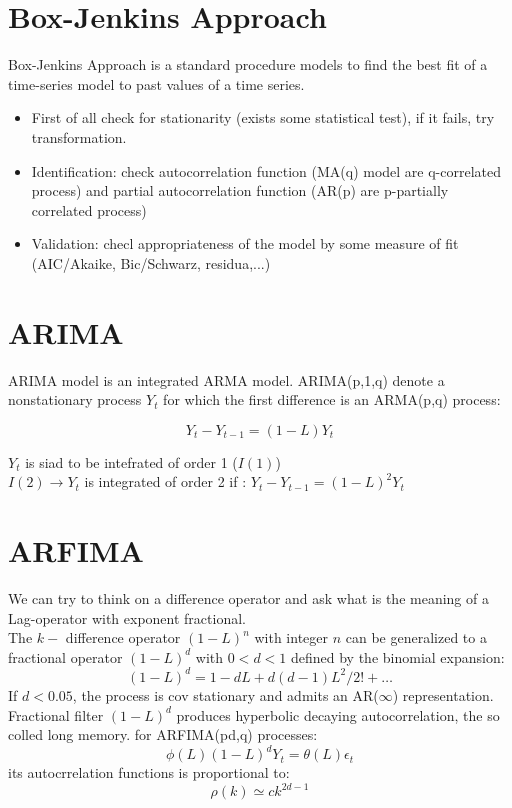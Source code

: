 \section{Box-Jenkins Approach}
Box-Jenkins Approach is a standard procedure models to find the best fit of a time-series model to past values of a time series.
\begin{itemize}
	\item First of all check for stationarity (exists some statistical test), if it fails, try transformation.
	\item Identification: check autocorrelation function (MA(q) model are q-correlated process) and partial autocorrelation function (AR(p) are p-partially correlated process) 
	\item Validation: checl appropriateness of the model by some measure of fit (AIC/Akaike, Bic/Schwarz, residua,...)
\end{itemize}
\section{ARIMA}
ARIMA model is an integrated ARMA model. ARIMA(p,1,q) denote a nonstationary process $Y_t$ for which the first difference is an ARMA(p,q) process:
\begin{mydefinition}[ARIMA(p,1,q)]
		\begin{equation}
		Y_t - Y_{t-1} = (1-L)Y_t
	\end{equation}
\label{ARIMA}
\end{mydefinition}
$Y_t$ is siad to be intefrated of order 1 ($I(1)$)\\
$I(2) \rightarrow Y_t$ is integrated of order 2 if : $Y_{t} - Y_{t-1} = (1-L)^2Y_t$
\section{ARFIMA}
We can try to think on a difference operator and ask what is the meaning of a Lag-operator with exponent fractional.\\
The $k-$ difference operator $(1-L)^n$ with integer $n$ can be generalized to a fractional operator $(1-L)^d$ with $0<d<1$ defined by the binomial expansion:
\[
(1-L)^d = 1 -dL + d(d-1)L^2/2! + \ldots
\]
If $d< 0.05$, the process is cov stationary and admits an AR($\infty$) representation.\\
Fractional filter $(1-L)^d$ produces hyperbolic decaying autocorrelation, the so colled long memory. for ARFIMA(pd,q) processes:
\[
\phi(L) (1-L)^dY_t = \theta(L)\epsilon_t
\]
its autocrrelation functions is proportional to:
\[
\rho(k) \simeq ck^{2d -1}
\]